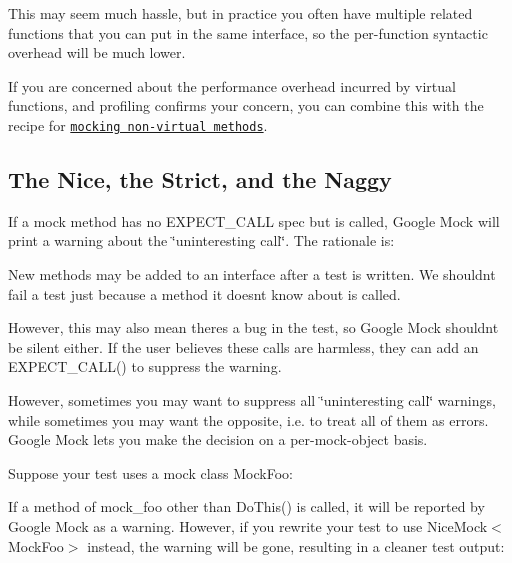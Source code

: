 This may seem much hassle, but in practice you often have multiple related functions that you can put in the same interface, so the per-\/function syntactic overhead will be much lower.

If you are concerned about the performance overhead incurred by virtual functions, and profiling confirms your concern, you can combine this with the recipe for \href{#mocking-nonvirtual-methods}{\tt mocking non-\/virtual methods}.

\subsection*{The Nice, the Strict, and the Naggy}

If a mock method has no {\ttfamily E\+X\+P\+E\+C\+T\+\_\+\+C\+A\+LL} spec but is called, Google Mock will print a warning about the \char`\"{}uninteresting call\char`\"{}. The rationale is\+:


\begin{DoxyItemize}
\item New methods may be added to an interface after a test is written. We shouldn\textquotesingle{}t fail a test just because a method it doesn\textquotesingle{}t know about is called.
\item However, this may also mean there\textquotesingle{}s a bug in the test, so Google Mock shouldn\textquotesingle{}t be silent either. If the user believes these calls are harmless, they can add an {\ttfamily E\+X\+P\+E\+C\+T\+\_\+\+C\+A\+L\+L()} to suppress the warning.
\end{DoxyItemize}

However, sometimes you may want to suppress all \char`\"{}uninteresting call\char`\"{} warnings, while sometimes you may want the opposite, i.\+e. to treat all of them as errors. Google Mock lets you make the decision on a per-\/mock-\/object basis.

Suppose your test uses a mock class {\ttfamily Mock\+Foo}\+:


\begin{DoxyCode}{0}
\DoxyCodeLine{\}}
\end{DoxyCode}


If a method of {\ttfamily mock\+\_\+foo} other than {\ttfamily Do\+This()} is called, it will be reported by Google Mock as a warning. However, if you rewrite your test to use {\ttfamily Nice\+Mock$<$Mock\+Foo$>$} instead, the warning will be gone, resulting in a cleaner test output\+:


